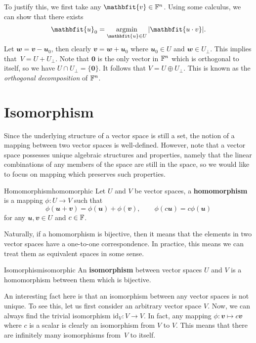 \documentclass[math]{amznotes}
\theoremstyle{remark}
\newcommand{\zero}{\mathbf{0}}
\DeclareMathOperator*{\argmin}{argmin}
\begin{document}
To justify this, we first take any $\mathbfit{v} \in \F^n$. Using some calculus, we can show that there exists 
\begin{equation*}
    \mathbfit{u}_0 = \argmin_{\mathbfit{u} \in U}\abs{\mathbfit{u \cdot v}}.
\end{equation*}
Let $\mathbfit{w = v - u}_0$, then clearly $\mathbfit{v = w + u}_0$ where $\mathbfit{u}_0 \in U$ and $\mathbfit{w} \in U_{\perp}$. This implies that~$V = U + U_{\perp}$. Note that $\zero$ is the only vector in $\mathbb{F}^n$ which is orthogonal to itself, so we have $U \cap U_{\perp} = \{\zero\}$. It follows that $V = U \oplus U_{\perp}$. This is known as the \textit{orthogonal decomposition} of $\mathbb{F}^n$.
\section{Isomorphism}
Since the underlying structure of a vector space is still a set, the notion of a mapping between two vector spaces is well-defined. However, note that a vector space possesses unique algebraic structures and properties, namely that the linear combinations of any members of the space are still in the space, so we would like to focus on mapping which preserves such properties.
\begin{dfnbox}{Homomorphism}{homomorphic}
    Let $U$ and $V$ be vector spaces, a {\color{red} \textbf{homomorphism}} is a mapping $\phi \colon U \to V$ such that
    \begin{equation*}
        \phi(\mathbfit{u + v}) = \phi(\mathbfit{u}) + \phi(\mathbfit{v}), \qquad \phi(c\mathbfit{u}) = c\phi(\mathbfit{u})
    \end{equation*}
    for any $\mathbfit{u}, \mathbfit{v} \in U$ and $c \in \mathbb{F}$.
\end{dfnbox}
Naturally, if a homomorphism is bijective, then it means that the elements in two vector spaces have a one-to-one correspondence. In practice, this means we can treat them as equivalent spaces in some sense.
\begin{dfnbox}{Isomorphism}{isomorphic}
    An {\color{red} \textbf{isomorphism}} between vector spaces $U$ and $V$ is a homomorphism between them which is bijective.
\end{dfnbox}
An interesting fact here is that an isomorphism between any vector spaces is not unique. To see this, let us first consider an arbitrary vector space $V$. Now, we can always find the trivial isomorphism $\mathrm{id}_V \colon V \to V$. In fact, any mapping $\phi \colon \mathbfit{v} \mapsto c\mathbfit{v}$ where $c$ is a scalar is clearly an isomorphism from $V$ to $V$. This means that there are infinitely many isomorphisms from~$V$ to itself.
\end{document}
